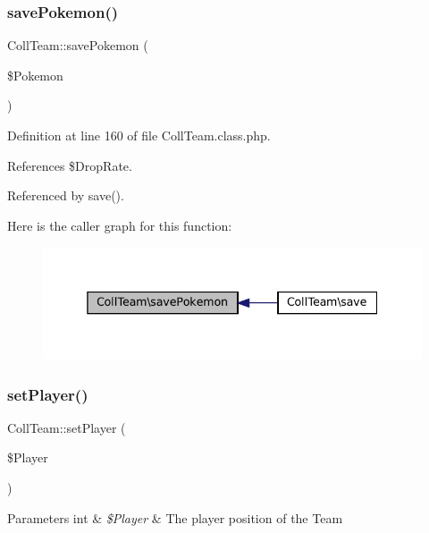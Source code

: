 \subsubsection{\texorpdfstring{save\+Pokemon()}{savePokemon()}}
{\footnotesize\ttfamily Coll\+Team\+::save\+Pokemon (\begin{DoxyParamCaption}\item[{}]{\$\+Pokemon }\end{DoxyParamCaption})\hspace{0.3cm}{\ttfamily [protected]}}



Definition at line 160 of file Coll\+Team.\+class.\+php.



References \$\+Drop\+Rate.



Referenced by save().

Here is the caller graph for this function\+:\nopagebreak
\begin{figure}[H]
\begin{center}
\leavevmode
\includegraphics[width=338pt]{class_coll_team_aa72d17df4167ca7a0a71ff6c7dd9dc19_icgraph}
\end{center}
\end{figure}
\mbox{\label{class_coll_team_a233f56aa60b823e4480dc3e5828cfd36}} 
\subsubsection{\texorpdfstring{set\+Player()}{setPlayer()}}
{\footnotesize\ttfamily Coll\+Team\+::set\+Player (\begin{DoxyParamCaption}\item[{}]{\$\+Player }\end{DoxyParamCaption})}


\begin{DoxyParams}[1]{Parameters}
int & {\em \$\+Player} & The player position of the Team \\
\hline
\end{DoxyParams}


